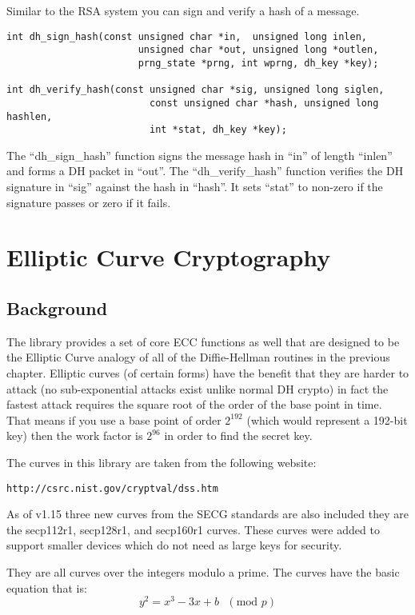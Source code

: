 \documentclass[synpaper]{book}
\newcommand{\mysection}[1]    %
	{                   %
	\section{#1}
   \markboth{\textsf{www.libtom.org}}{\thesection ~ {#1}}
	}
\begin{document}
Similar to the RSA system you can sign and verify a hash of a message.
 
\begin{verbatim}
int dh_sign_hash(const unsigned char *in,  unsigned long inlen,
                       unsigned char *out, unsigned long *outlen,
                       prng_state *prng, int wprng, dh_key *key);

int dh_verify_hash(const unsigned char *sig, unsigned long siglen,
                         const unsigned char *hash, unsigned long hashlen, 
                         int *stat, dh_key *key);
\end{verbatim}

The ``dh\_sign\_hash'' function signs the message hash in ``in'' of length ``inlen'' and forms a DH packet in ``out''.  
The ``dh\_verify\_hash'' function verifies the DH signature in ``sig'' against the hash in ``hash''.  It sets ``stat''
to non-zero if the signature passes or zero if it fails.

\chapter{Elliptic Curve Cryptography}

\mysection{Background}
The library provides a set of core ECC functions as well that are designed to be the Elliptic Curve analogy of all of the 
Diffie-Hellman routines in the previous chapter.  Elliptic curves (of certain forms) have the benefit that they are harder
to attack (no sub-exponential attacks exist unlike normal DH crypto) in fact the fastest attack requires the square root
of the order of the base point in time.  That means if you use a base point of order $2^{192}$ (which would represent a
192-bit key) then the work factor is $2^{96}$ in order to find the secret key.

The curves in this library are taken from the following website:
\begin{verbatim}
http://csrc.nist.gov/cryptval/dss.htm
\end{verbatim}

As of v1.15 three new curves from the SECG standards are also included they are the secp112r1, secp128r1, and secp160r1 curves.  These curves were added to 
support smaller devices which do not need as large keys for security.

They are all curves over the integers modulo a prime.  The curves have the basic equation that is:
\begin{equation}
y^2 = x^3 - 3x + b\mbox{ }(\mbox{mod }p)
\end{equation}
\end{document}
